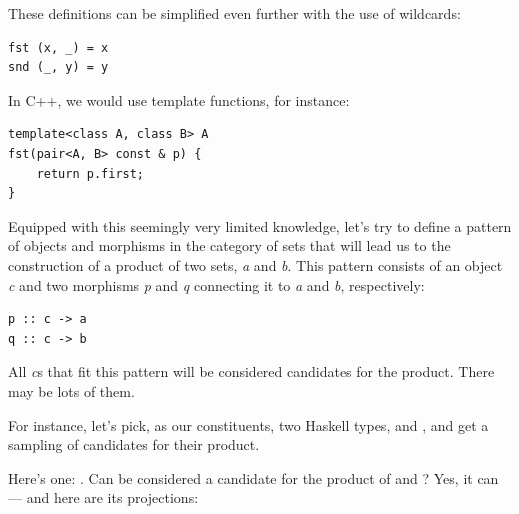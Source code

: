 These definitions can be simplified even further with the use of
wildcards:

\begin{verbatim}
fst (x, _) = x
snd (_, y) = y
\end{verbatim}

In C++, we would use template functions, for instance:

\begin{verbatim}
template<class A, class B> A
fst(pair<A, B> const & p) {
    return p.first;
}
\end{verbatim}

Equipped with this seemingly very limited knowledge, let's try to define
a pattern of objects and morphisms in the category of sets that will
lead us to the construction of a product of two sets, \emph{a} and
\emph{b}. This pattern consists of an object \emph{c} and two morphisms
\emph{p} and \emph{q} connecting it to \emph{a} and \emph{b},
respectively:

\begin{verbatim}
p :: c -> a
q :: c -> b
\end{verbatim}

\begin{figure}[H]
  \centering
\end{figure}

\noindent
All \emph{c}s that fit this pattern will be considered candidates for
the product. There may be lots of them.

\begin{figure}[H]
  \centering
\end{figure}

\noindent
For instance, let's pick, as our constituents, two Haskell types,
 and , and get a sampling of candidates for
their product.

Here's one: . Can  be considered a candidate for
the product of  and ? Yes, it can --- and here
are its projections:

